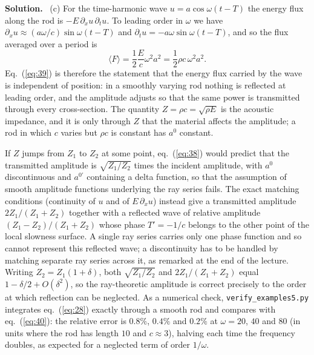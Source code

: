 \documentclass[a4paper,12pt]{paper}
\newcounter{example}
\newenvironment{solution}{\par\noindent\textbf{Solution.}\ }{\par\medskip}
\begin{document}
\begin{solution}
\noindent (c) For the time-harmonic wave $u=a\cos\omega(t-T)$ the energy flux along the rod is
$-E\,\partial_{x}u\,\partial_{t}u$. To leading order in $\omega$ we have
$\partial_{x}u\approx(a\omega/c)\sin\omega(t-T)$ and $\partial_{t}u=-a\omega\sin\omega(t-T)$, and so the
flux averaged over a period is
\begin{equation}
\langle F\rangle=\frac{1}{2}\frac{E}{c}\omega^{2}a^{2}=\frac{1}{2}\rho c\,\omega^{2}a^{2}.
\label{eq:41}
\end{equation}
Eq.~(\ref{eq:39}) is therefore the statement that the energy flux carried by the wave is independent
of position: in a smoothly varying rod nothing is reflected at leading order, and the amplitude
adjusts so that the same power is transmitted through every cross-section. The quantity
$Z=\rho c=\sqrt{\rho E}$ is the acoustic impedance, and it is only through $Z$ that the material
affects the amplitude; a rod in which $c$ varies but $\rho c$ is constant has $a^{0}$ constant.

If $Z$ jumps from $Z_{1}$ to $Z_{2}$ at some point, eq.~(\ref{eq:38}) would predict that the
transmitted amplitude is $\sqrt{Z_{1}/Z_{2}}$ times the incident amplitude, with $a^{0}$
discontinuous and $a^{0\prime}$ containing a delta function, so that the assumption of smooth
amplitude functions underlying the ray series fails. The exact matching conditions (continuity of
$u$ and of $E\,\partial_{x}u$) instead give a transmitted amplitude $2Z_{1}/(Z_{1}+Z_{2})$ together with
a reflected wave of relative amplitude $(Z_{1}-Z_{2})/(Z_{1}+Z_{2})$ whose phase $T'=-1/c$ belongs to
the other point of the local slowness surface. A single ray series carries only one phase function
and so cannot represent this reflected wave; a discontinuity has to be handled by matching separate
ray series across it, as remarked at the end of the lecture. Writing $Z_{2}=Z_{1}(1+\delta)$, both
$\sqrt{Z_{1}/Z_{2}}$ and $2Z_{1}/(Z_{1}+Z_{2})$ equal $1-\delta/2+O(\delta^{2})$, so the ray-theoretic
amplitude is correct precisely to the order at which reflection can be neglected. As a numerical
check, \texttt{verify\_examples5.py} integrates eq.~(\ref{eq:28}) exactly through a smooth rod and
compares with eq.~(\ref{eq:40}): the relative error is $0.8\%$, $0.4\%$ and $0.2\%$ at
$\omega=20$, $40$ and $80$ (in units where the rod has length $10$ and $c\approx3$), halving each time
the frequency doubles, as expected for a neglected term of order $1/\omega$.
\end{solution}
\end{document}
